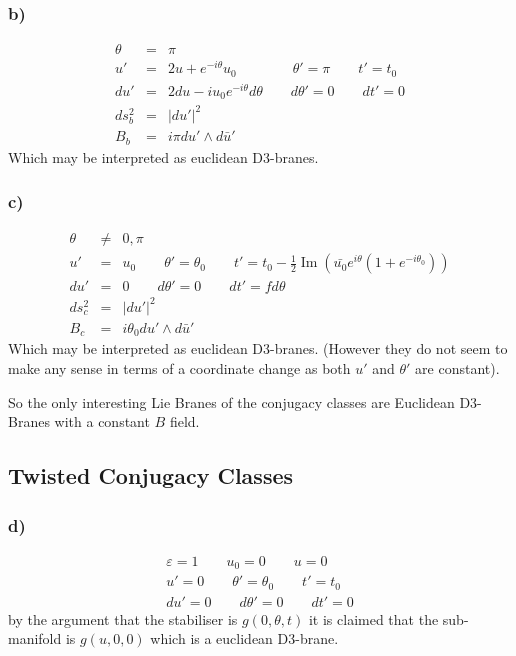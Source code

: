 \documentclass[11pt, a4paper]{article}
\DeclareMathOperator{\im}{Im}
\newcommand{\1}{\mathbb{1}}
\begin{document}
\subsubsection{b)}
\begin{eqnarray}
  \label{eq:b}
  \theta&=&\pi\\\nonumber
  u'&=&2u+e^{-i\theta}u_0\qquad\qquad\theta'=\pi\qquad t'=t_0\\\nonumber
  du'&=&2du-iu_0e^{-i\theta}d\theta\qquad d\theta'=0\qquad dt'=0\\\nonumber
  ds^2_b&=&|du'|^2\\\nonumber
  B_b&=&i\pi du'\wedge d\bar u'
\end{eqnarray}
Which may be interpreted as euclidean D3-branes.

\subsubsection{c)}
\begin{eqnarray}
  \label{eq:c}
  \theta&\neq&0,\pi\\\nonumber
  u'&=&u_0\qquad \theta'=\theta_0\qquad t'=t_0-\frac
  12\im(\bar{u_0}e^{i\theta}(1+e^{-i\theta_0}))\\\nonumber
  du'&=&0\qquad d\theta'=0\qquad dt'=fd\theta\\\nonumber
  ds^2_c&=&|du'|^2\\\nonumber
  B_c&=&i\theta_0 du'\wedge d\bar u'
\end{eqnarray}
Which may be interpreted as euclidean D3-branes. (However they do not seem to
make any sense in terms of a coordinate change as both $u'$ and $\theta'$ are
constant).

So the only interesting Lie Branes of the conjugacy classes are Euclidean
D3-Branes with a constant $B$ field.

\subsection{Twisted Conjugacy Classes}
\subsubsection{d)}
\begin{eqnarray}
  \label{eq:d}
  \varepsilon=1\qquad u_0=0\qquad u=0\\\nonumber
  u'=0\qquad \theta'=\theta_0\qquad t'=t_0\\\nonumber
  du'=0\qquad d\theta'=0\qquad dt'=0
\end{eqnarray}
by the argument that the stabiliser is $g(0,\theta,t)$ it is claimed that the
sub-manifold is $g(u,0,0)$ which is a euclidean D3-brane.
\end{document}

